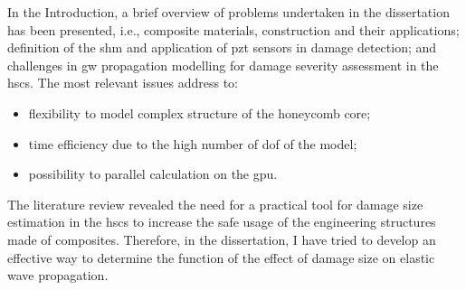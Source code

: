 In the Introduction, a brief overview of problems undertaken in the dissertation has been presented, i.e., composite materials, construction and their applications;  definition of the \ac{shm} and application of \ac{pzt} sensors in damage detection; and challenges in \ac{gw} propagation modelling for damage severity assessment in the \acp{hsc}.
The most relevant issues address to:
\begin{itemize}
	\item flexibility to model complex structure of the honeycomb core;
	\item time efficiency due to the high number of \ac{dof} of the model;
	\item possibility to parallel calculation on the \ac{gpu}.
\end{itemize}
The literature review revealed the need for a practical tool for damage size estimation in the \acp{hsc} to increase the safe usage of the engineering structures made of composites. 
Therefore, in the dissertation, I have tried to develop an effective way to determine the function of the effect of damage size on elastic wave propagation.

